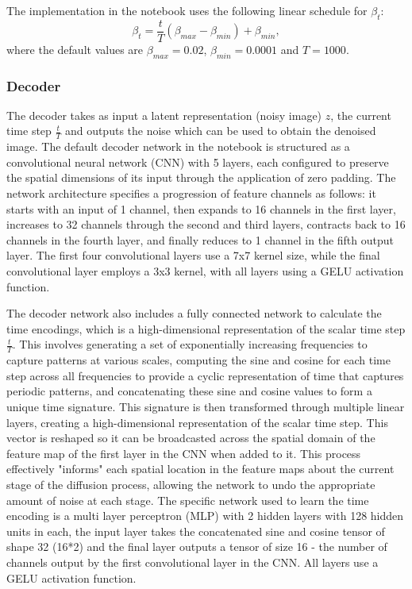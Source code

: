 \documentclass[11pt]{article}
\begin{document}
The implementation in the notebook uses the following linear schedule for $\beta_t$:
\begin{equation}
    \beta_t = \frac{t}{T}(\beta_{max}-\beta_{min})+ \beta_{min},
\end{equation}
where the default values are $\beta_{max} = 0.02$, $\beta_{min} = 0.0001$ and $T=1000$.

\subsubsection{Decoder}
The decoder takes as input a latent representation (noisy image) $z$, the current time step $\frac{t}{T}$ and outputs the noise which can be used to obtain the denoised image. The default decoder network in the notebook is structured as a convolutional neural network (CNN) with 5 layers, each configured to preserve the spatial dimensions of its input through the application of zero padding. The network architecture specifies a progression of feature channels as follows: it starts with an input of 1 channel, then expands to 16 channels in the first layer, increases to 32 channels through the second and third layers, contracts back to 16 channels in the fourth layer, and finally reduces to 1 channel in the fifth output layer. The first four convolutional layers use a 7x7 kernel size, while the final convolutional layer employs a 3x3 kernel, with all layers using a GELU activation function.

The decoder network also includes a fully connected network to calculate the time encodings, which is a high-dimensional representation of the scalar time step $\frac{t}{T}$. This involves generating a set of exponentially increasing frequencies to capture patterns at various scales, computing the sine and cosine for each time step across all frequencies to provide a cyclic representation of time that captures periodic patterns, and concatenating these sine and cosine values to form a unique time signature. This signature is then transformed through multiple linear layers, creating a high-dimensional representation of the scalar time step. This vector is reshaped so it can be broadcasted across the spatial domain of the feature map of the first layer in the CNN when added to it. This process effectively "informs" each spatial location in the feature maps about the current stage of the diffusion process, allowing the network to undo the appropriate amount of noise at each stage. The specific network used to learn the time encoding is a multi layer perceptron (MLP) with 2 hidden layers with 128 hidden units in each, the input layer takes the concatenated sine and cosine tensor of shape 32 (16*2) and the final layer outputs a tensor of size 16 - the number of channels output by the first convolutional layer in the CNN. All layers use a GELU activation function.
\end{document}
